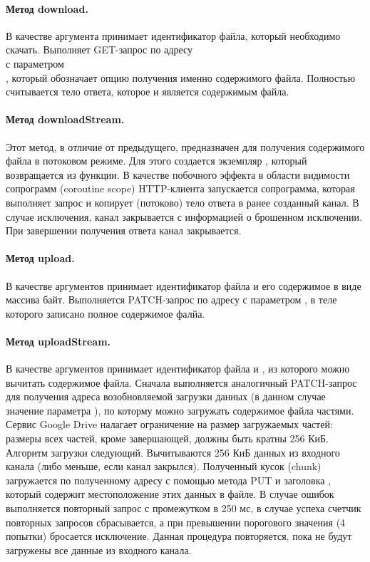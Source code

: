     \paragraph{Метод download.} В качестве аргумента принимает идентификатор файла, который необходимо скачать. Выполняет GET-запрос по адресу\\  с параметром\\ , который обозначает опцию получения именно содержимого файла. Полностью считывается тело ответа, которое и является содержимым файла.

    \paragraph{Метод downloadStream.} Этот метод, в отличие от предыдущего, предназначен для получения содержимого файла в потоковом режиме. Для этого создается экземпляр , который возвращается из функции. В качестве побочного эффекта в области видимости сопрограмм (coroutine scope) HTTP-клиента запускается сопрограмма, которая выполняет запрос и копирует (потоково) тело ответа в ранее созданный канал. В случае исключения, канал закрывается с информацией о брошенном исключении. При завершении получения ответа канал закрывается.

    \paragraph{Метод upload.} В качестве аргументов принимает идентификатор файла и его содержимое в виде массива байт. Выполняется PATCH-запрос по адресу  с параметром , в теле которого записано полное содержимое фалйа.

    \paragraph{Метод uploadStream.} В качестве аргументов принимает идентификатор файла и , из которого можно вычитать содержимое файла. Сначала выполняется аналогичный PATCH-запрос для получения адреса возобновляемой загрузки данных (в данном случае значение параметра ), по которму можно загружать содержимое файла частями. Сервис Google Drive налагает ограничение на размер загружаемых частей: размеры всех частей, кроме завершающей, должны быть кратны 256 КиБ. Алгоритм загрузки следующий. Вычитываются 256 КиБ данных из входного канала (либо меньше, если канал закрылся). Полученный кусок (chunk) загружается по полученному адресу с помощью метода PUT и заголовка , который содержит местоположение этих данных в файле. В случае ошибок выполняется повторный запрос с промежутком в 250 мс, в случае успеха счетчик повторных запросов сбрасывается, а при превышении порогового значения (4 попытки) бросается исключение. Данная процедура повторяется, пока не будут загружены все данные из входного канала.

